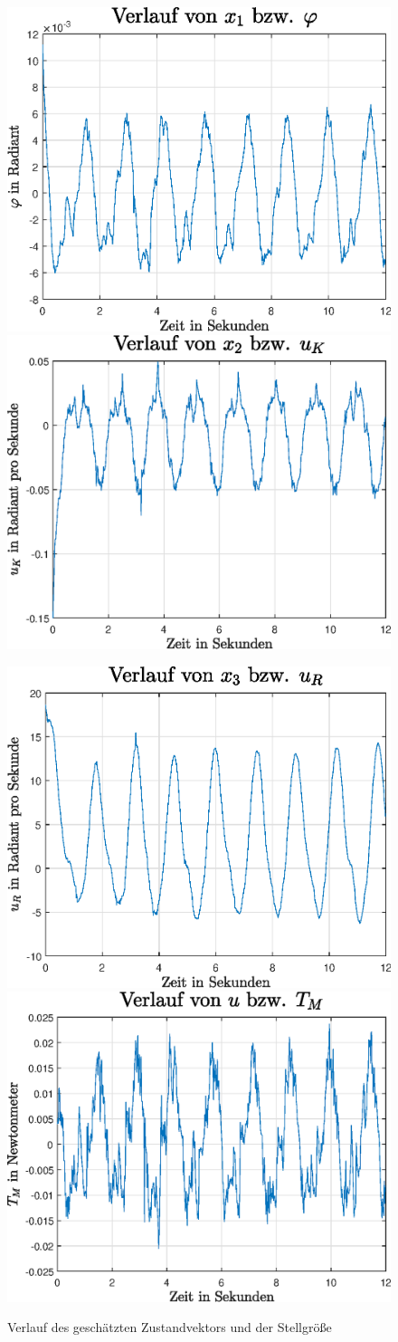 \begin{figure}[H]
\centering
\includegraphics[width=0.43\linewidth]{img/edge_exp3_phi.eps}
\includegraphics[width=0.43\linewidth]{img/edge_exp3_uk.eps}
\vspace{0.5cm}

\includegraphics[width=0.43\linewidth]{img/edge_exp3_ur.eps}
\includegraphics[width=0.43\linewidth]{img/edge_exp3_tm.eps}
\label{plots_phiobs}
\caption{Verlauf des geschätzten Zustandvektors und der Stellgröße}
\end{figure}

